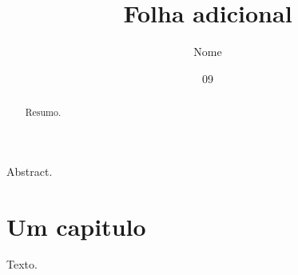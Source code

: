 \documentclass[dsc,dadoscoleta]{ufrj}
\title{Folha adicional}
\author{Nome}{Sobrenome}
\date{09}{2026}
\begin{document}
  \maketitle
  \frontmatter
  \begin{abstract}Resumo.\end{abstract}
  \begin{foreignabstract}Abstract.\end{foreignabstract}
  \tableofcontents
  \mainmatter
  \chapter{Um capitulo}
  Texto.
\end{document}
